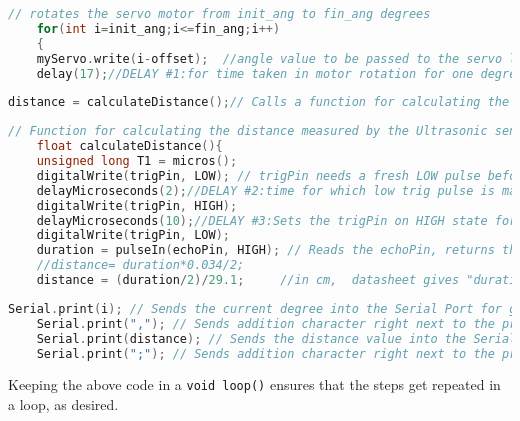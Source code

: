 \begin{mdframed}[backgroundcolor=light-gray, roundcorner=10pt,leftmargin=1, rightmargin=1, innerleftmargin=15, innertopmargin=15,innerbottommargin=15, outerlinewidth=1, linecolor=light-gray]
	\begin{lstlisting}[caption={Step 1},language = C]
	// rotates the servo motor from init_ang to fin_ang degrees
	for(int i=init_ang;i<=fin_ang;i++)
	{  
	myServo.write(i-offset);  //angle value to be passed to the servo library object for writing into the motor
	delay(17);//DELAY #1:for time taken in motor rotation for one degree before calculating distance
	\end{lstlisting}
	
\begin{lstlisting}[caption={Step 2},language = C]
	distance = calculateDistance();// Calls a function for calculating the distance measured by the Ultrasonic sensor for each degree
	\end{lstlisting}
	
\begin{lstlisting}[caption={Function called above},language = C]
	// Function for calculating the distance measured by the Ultrasonic sensor
	float calculateDistance(){ 
	unsigned long T1 = micros();
	digitalWrite(trigPin, LOW); // trigPin needs a fresh LOW pulse before sending a HIGH pulse that can be detected from echoPin
	delayMicroseconds(2);//DELAY #2:time for which low trig pulse is maintained before making it high
	digitalWrite(trigPin, HIGH); 
	delayMicroseconds(10);//DELAY #3:Sets the trigPin on HIGH state for 10 micro seconds
	digitalWrite(trigPin, LOW);
	duration = pulseIn(echoPin, HIGH); // Reads the echoPin, returns the sound wave travel time in microseconds
	//distance= duration*0.034/2;
	distance = (duration/2)/29.1;     //in cm,  datasheet gives "duration/58" as the formula
	\end{lstlisting}
	
\begin{lstlisting}[caption={Step 3},language = C]
	Serial.print(i); // Sends the current degree into the Serial Port for graphical representation
	Serial.print(","); // Sends addition character right next to the previous value needed later in the Processing IDE for indexing
	Serial.print(distance); // Sends the distance value into the Serial Port for the graph
	Serial.print(";"); // Sends addition character right next to the previous value needed later in the Processing IDE for indexing
\end{lstlisting}
\end{mdframed}
\vspace{1cm}
Keeping the above code in a \texttt{void loop(){}} ensures that the steps get repeated in a loop, as desired.
\clearpage
